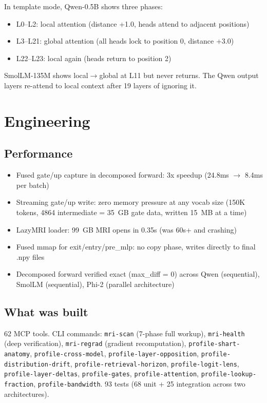 \documentclass[11pt]{article}
\begin{document}
In template mode, Qwen-0.5B shows three phases:
\begin{itemize}
\item L0--L2: local attention (distance +1.0, heads attend to adjacent positions)
\item L3--L21: global attention (all heads lock to position 0, distance +3.0)
\item L22--L23: local again (heads return to position 2)
\end{itemize}

SmolLM-135M shows local$\to$global at L11 but never returns. The Qwen output layers re-attend to local context after 19 layers of ignoring it.

\section{Engineering}

\subsection{Performance}
\begin{itemize}
\item Fused gate/up capture in decomposed forward: 3x speedup (24.8ms $\to$ 8.4ms per batch)
\item Streaming gate/up write: zero memory pressure at any vocab size (150K tokens, 4864 intermediate = 35~GB gate data, written 15~MB at a time)
\item LazyMRI loader: 99~GB MRI opens in 0.35s (was 60s+ and crashing)
\item Fused mmap for exit/entry/pre\_mlp: no copy phase, writes directly to final .npy files
\item Decomposed forward verified exact (max\_diff = 0) across Qwen (sequential), SmolLM (sequential), Phi-2 (parallel architecture)
\end{itemize}

\subsection{What was built}
62 MCP tools. CLI commands: \texttt{mri-scan} (7-phase full workup), \texttt{mri-health} (deep verification), \texttt{mri-regrad} (gradient recomputation), \texttt{profile-shart-anatomy}, \texttt{profile-cross-model}, \texttt{profile-layer-opposition}, \texttt{profile-distribution-drift}, \texttt{profile-retrieval-horizon}, \texttt{profile-logit-lens}, \texttt{profile-layer-deltas}, \texttt{profile-gates}, \texttt{profile-attention}, \texttt{profile-lookup-fraction}, \texttt{profile-bandwidth}. 93 tests (68 unit + 25 integration across two architectures).
\end{document}
